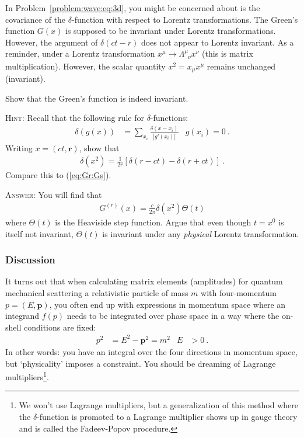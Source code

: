 \documentclass[12pt]{article}
\numberwithin{equation}{subsection}    %
\renewcommand{\vec}[1]{\mathbf{#1}} %
\begin{document}
In Problem~\ref{problem:wave:eq:3d}, you might be concerned about is the covariance of the $\delta$-function with respect to Lorentz transformations. The Green's function $G(x)$ is supposed to be invariant under Lorentz transformations. However, the argument of $\delta(ct - r)$ does not appear to Lorentz invariant. As a reminder, under a Lorentz transformation $x^\mu \to \Lambda^\mu_{\phantom\mu\nu}x^\nu$ (this is matrix multiplication). However, the scalar quantity $x^2 = x_\mu x^\mu$ remains unchanged (invariant).

Show that the Green's function is indeed invariant.


\textsc{Hint:} Recall that the following rule for $\delta$-functions:
\begin{align}
	\delta\left(g(x)\right) &= \sum_{x_i} \frac{\delta(x-x_i)}{|g'(x_i)|}
	&
	g(x_i) = 0 \ .
\end{align}
Writing $x = (ct,\vec r)$, show that
\begin{align}
	\delta(x^2) = \frac{1}{2r} \left[
	\delta(r-ct) - \delta(r+ct)
	\right] \ .
\end{align}
Compare this to (\ref{eq:Gr:Gs}). 

\textsc{Answer}: You will find that 
\begin{align}
	G^{(r)}(x) = \frac{c}{2\pi} \delta(x^2) \Theta(t)
\end{align}
where $\Theta(t)$ is the Heaviside step function. Argue that even though $t=x^0$ is itself not invariant, $\Theta(t)$ is invariant under any \emph{physical} Lorentz transformation. 


\subsubsection{Discussion}
It turns out that when calculating matrix elements (amplitudes) for quantum mechanical scattering a relativistic particle of mass $m$ with four-momentum $p = (E,\vec p)$, you often end up with expressions in momentum space where an integrand $f(p)$ needs to be integrated over phase space in a way where the on-shell conditions are fixed:
\begin{align}
	p^2 &= E^2 - \vec p^2 = m^2 
	&
	E &>0
	\ .
\end{align}
In other words: you have an integral over the four directions in momentum space, but `physicality' imposes a constraint. You should be dreaming of Lagrange multipliers\footnote{We won't use Lagrange multipliers, but a generalization of this method where the $\delta$-function is promoted to a Lagrange multiplier shows up in gauge theory and is called the Fadeev-Popov procedure.}. 
\end{document}
